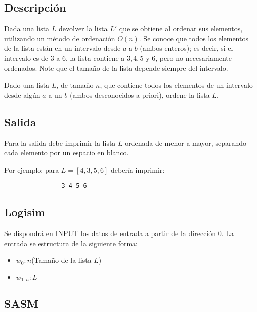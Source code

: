 \documentclass[a4paper]{article}
\begin{document}
\begin{flushleft}
      		 \subsection*{Descripción}
      		 
      		Dada una lista $L$ devolver la lista $L'$ que se obtiene al ordenar sus  elementos, utilizando un método de ordenación $O(n)$. Se conoce que todos los elementos de la lista están en un intervalo desde $a$ a $b$ (ambos enteros); es decir, si el intervalo es de $3$ a $6$, la lista contiene a $3, 4, 5$ y $6$, pero no necesariamente ordenados. Note que el tamaño de la lista depende siempre del intervalo.\newline
      		
      		Dado una lista $L$, de tamaño $n$, que contiene todos los elementos de un intervalo desde algún $a$ a un $b$ (ambos desconocidos a priori), ordene la lista $L$.
      		 
      		 \subsection*{Salida}
      		 
      		 Para la salida debe imprimir la lista $L$ ordenada de menor a mayor, separando cada elemento por un espacio en blanco.\newline
      		 
      		 Por ejemplo: para $L = [4, 3, 5, 6]$ debería imprimir:
      		 
      		 \begin{lstlisting}
      		 	3 4 5 6
      		 \end{lstlisting}
      		 
      		 	\subsection*{Logisim}
      		 
      		 Se dispondrá en INPUT los datos de entrada a partir de la dirección 0. La entrada se estructura de la siguiente forma:
      		 
      		 \begin{itemize}
      		 	
      		 	\item $w_{0}: n $(Tamaño de la lista $L$)
      		 	\item $w_{1:n} : L$
      		 \end{itemize}
      		 
      		 	\subsection*{SASM}
      		 

\end{flushleft}
\end{document}
